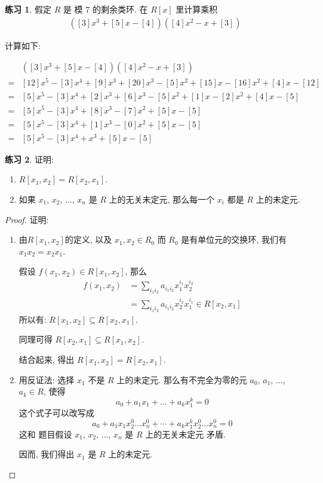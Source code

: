 \documentclass[utf8]{ctexbook}
\theoremstyle{definition}
\newtheorem{exercise}{练习}[section]
\begin{document}
\begin{exercise}
假定  $R$ 是 模 $7$ 的剩余类环. 在 $R[x]$ 里计算乘积
\begin{align*}
( [3] x^3 + [5] x - [4] )( [4] x^2 - x + [3] )
\end{align*}

计算如下:

\begin{align*}
& ( [3] x^3 + [5] x - [4] )( [4] x^2 - x + [3] ) \\
= & [12] x^5 - [3] x^4 + [9] x^3 + [20] x^3 - [5] x^2 + [15] x - [16] x^2 + [4] x - [12] \\
= & [5] x^5 - [3] x^4 + [2] x^3 + [6] x^3 - [5] x^2 + [1] x - [2] x^2 + [4] x - [5] \\
= & [5] x^5 - [3] x^4 + [8] x^3 - [7] x^2 + [5] x  - [5] \\
= & [5] x^5 - [3] x^4 + [1] x^3 - [0] x^2 + [5] x  - [5] \\
= & [5] x^5 - [3] x^4 + x^3 + [5] x  - [5]
\end{align*}

\end{exercise}

\begin{exercise}
证明:
\begin{enumerate}
\item{$R[x_1, x_2] = R[x_2, x_1]$.}
\item{如果 $x_1$, $x_2$, $\ldots$, $x_n$ 是 $R$ 上的无关未定元, 那么每一个 $x_i$ 都是 $R$ 上的未定元.}
\end{enumerate}
\end{exercise}

\begin{proof}
证明:
\begin{enumerate}
\item{由$R[x_1, x_2]$的定义, 以及 $x_1, x_2 \in R_0$ 而 $R_0$ 是有单位元的交换环, 我们有$x_1 x_2 = x_2 x_1$.

假设 $f(x_1, x_2) \in R[x_1, x_2]$, 那么
\begin{align*}
f(x_1, x_2) &= \sum_{i_1 i_2} a_{i_1 i_2} x_1 ^{i_1} x_2 ^{i_2}  \\
&= \sum_{i_1 i_2} a_{i_1 i_2} x_2 ^{i_2} x_1 ^{i_1} \in R[x_2, x_1] 
\end{align*}
所以有: $R[x_1, x_2] \subseteq R[x_2, x_1]$. 

同理可得 $R[x_2, x_1] \subseteq R[x_1, x_2]$.

结合起来, 得出 $R[x_1, x_2] = R[x_2, x_1]$.
}
\item{用反证法: 选择 $x_1$ 不是 $R$ 上的未定元. 那么有不完全为零的元 $a_0$, $a_1$, $\ldots$, $a_k \in R$, 使得
\begin{equation}
a_0 + a_1 x_1 + \ldots + a_k x_1 ^k = 0
\end{equation}
这个式子可以改写成
\begin{equation}
a_0 + a_1 x_1 x_2 ^0 \ldots x_n ^0 + \cdots + a_k x_1 ^k x_2 ^0 \ldots x_n ^0 = 0
\end{equation}
这和 题目假设 $x_1$, $x_2$, $\ldots$, $x_n$ 是 $R$ 上的无关未定元 矛盾.

因而, 我们得出 $x_1$ 是 $R$ 上的未定元.
}
\end{enumerate}
\end{proof}
\end{document}
